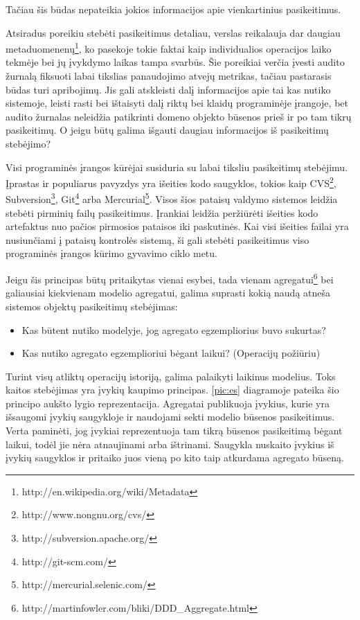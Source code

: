 Tačiau šis būdas nepateikia jokios informacijos apie vienkartinius pasikeitimus.

Atsiradus poreikiu stebėti pasikeitimus detaliau, verslas reikalauja dar daugiau metaduomenenų\footnote{http://en.wikipedia.org/wiki/Metadata}, ko pasekoje tokie faktai kaip individualios operacijos laiko tekmėje bei jų įvykdymo laikas tampa svarbūs. Šie poreikiai verčia įvesti audito žurnalą fiksuoti labai tikslias panaudojimo atvejų metrikas, tačiau pastarasis būdas turi apribojimų. Jis gali atskleisti dalį informacijos apie tai kas nutiko sistemoje, leisti rasti bei ištaisyti dalį riktų bei klaidų programinėje įrangoje, bet audito žurnalas neleidžia patikrinti domeno objekto būsenos prieš ir po tam tikrų pasikeitimų. O jeigu būtų galima išgauti daugiau informacijos iš pasikeitimų stebėjimo?

Visi programinės įrangos kūrėjai susiduria su labai tiksliu pasikeitimų stebėjimu. Įprastas ir populiarus pavyzdys yra išeities kodo saugyklos, tokios kaip CVS\footnote{http://www.nongnu.org/cvs/}, Subversion\footnote{http://subversion.apache.org/}, Git\footnote{http://git-scm.com/} arba Mercurial\footnote{http://mercurial.selenic.com/}. Visos šios pataisų valdymo sistemos leidžia stebėti pirminių failų pasikeitimus. Įrankiai leidžia peržiūrėti išeities kodo artefaktus nuo pačios pirmosios pataisos iki paskutinės. Kai visi išeities failai yra nusiunčiami į pataisų kontrolės sistemą, ši gali stebėti pasikeitimus viso programinės įrangos kūrimo gyvavimo ciklo metu.

Jeigu šis principas būtų pritaikytas vienai esybei, tada vienam agregatui\footnote{http://martinfowler.com/bliki/DDD\_Aggregate.html} bei galiausiai kiekvienam modelio agregatui, galima suprasti kokią naudą atneša sistemos objektų pasikeitimų stebėjimas:

\begin{itemize}

	\item Kas būtent nutiko modelyje, jog agregato egzempliorius buvo sukurtas?

	\item Kas nutiko agregato egzemplioriui bėgant laikui? (Operacijų požiūriu)

\end{itemize}

Turint visų atliktų operacijų istoriją, galima palaikyti laikinus modelius. Toks kaitos stebėjimas yra įvykių kaupimo principas. \ref{pic:es} diagramoje pateika šio principo aukšto lygio reprezentacija. Agregatai publikuoja įvykius, kurie yra išsaugomi įvykių saugykloje ir naudojami sekti modelio būsenos pasikeitimus. Verta paminėti, jog įvykiai reprezentuoja tam tikrą būsenos pasikeitimą bėgant laikui, todėl jie nėra atnaujinami arba ištrinami. Saugykla nuskaito įvykius iš įvykių saugyklos ir pritaiko juos vieną po kito taip atkurdama agregato būseną. 

